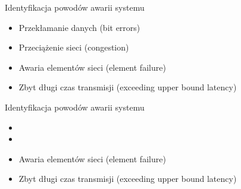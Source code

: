\documentclass[compress,red]{beamer}
\begin{document}
\begin{frame}{Identyfikacja powodów awarii systemu}


  \begin{itemize}
    \item Przekłamanie danych (bit errors)
    \item Przeciążenie sieci (congestion)
    \item Awaria elementów sieci (element failure)
    \item Zbyt długi czas transmisji (exceeding upper bound latency)
  \end{itemize}

\end{frame}

\begin{frame}{Identyfikacja powodów awarii systemu}


  \begin{itemize}
    \item \color{red}{Przekłamanie danych (bit errors)}
    \item \color{black}{Przeciążenie sieci (congestion)}
    \item Awaria elementów sieci (element failure)
    \item Zbyt długi czas transmisji (exceeding upper bound latency)
  \end{itemize}

\end{frame}
\end{document}
